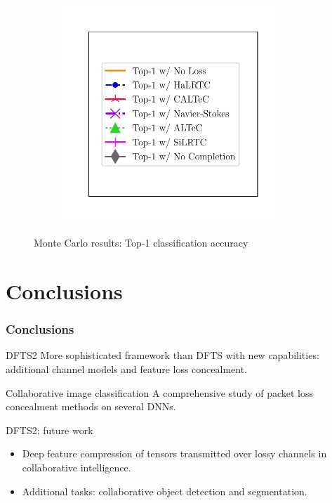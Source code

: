 \documentclass[aspectratio=169]{beamer}
\begin{document}
\begin{frame}
\begin{figure}[H]
\begin{subfigure}{.275\textwidth}
			\includegraphics[width=0.9\textwidth]{default_vcip_legend.pdf}
			\vspace*{-6mm}\caption{}
		\end{subfigure}
		\vspace*{-4mm}\caption{Monte Carlo results: Top-1 classification accuracy}
		\label{fig:mc}
	\end{figure}	
\end{frame}


\section{Conclusions}
\begin{frame}
\frametitle{Conclusions}
	\begin{block}{DFTS2}
		More sophisticated framework than DFTS with new capabilities: additional channel models and feature loss concealment.
	\end{block}
\begin{block}{Collaborative image classification}
	A comprehensive study of packet loss concealment methods on several DNNs.
\end{block}
\begin{block}{DFTS2: future work}
\begin{itemize}
    \item Deep feature compression of tensors transmitted over lossy channels in collaborative intelligence.
    \item Additional tasks: collaborative object detection and segmentation.
\end{itemize}
\end{block}
\end{frame}
\end{document}
